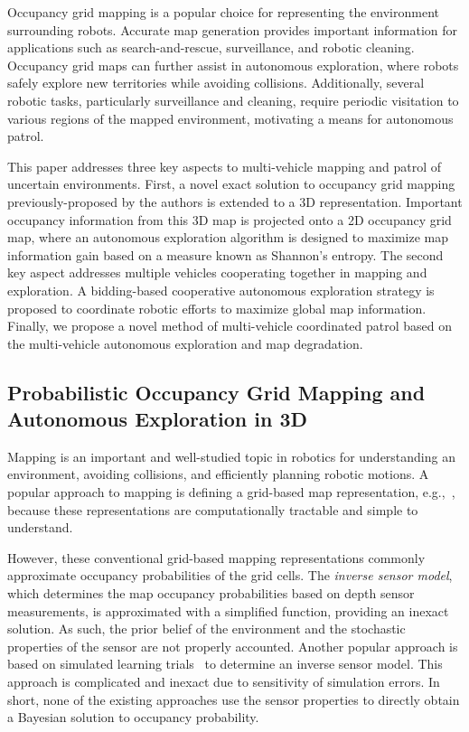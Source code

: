 \documentclass[smallextended]{svjour3}       %
\begin{document}
Occupancy grid mapping is a popular choice for representing the environment surrounding robots. Accurate map generation provides important information for applications such as search-and-rescue, surveillance, and robotic cleaning. Occupancy grid maps can further assist in autonomous exploration, where robots safely explore new territories while avoiding collisions. Additionally, several robotic tasks, particularly surveillance and cleaning, require periodic visitation to various regions of the mapped environment, motivating a means for autonomous patrol.

This paper addresses three key aspects to multi-vehicle mapping and patrol of uncertain environments. First, a novel exact solution to occupancy grid mapping previously-proposed by the authors is extended to a 3D representation. Important occupancy information from this 3D map is projected onto a 2D occupancy grid map, where an autonomous exploration algorithm is designed to maximize map information gain based on a measure known as Shannon's entropy. The second key aspect addresses multiple vehicles cooperating together in mapping and exploration. A bidding-based cooperative autonomous exploration strategy is proposed to coordinate robotic efforts to maximize global map information. Finally, we propose a novel method of multi-vehicle coordinated patrol based on the multi-vehicle autonomous exploration and map degradation.

\subsection{Probabilistic Occupancy Grid Mapping and Autonomous Exploration in 3D}

Mapping is an important and well-studied topic in robotics for understanding an environment, avoiding collisions, and efficiently planning robotic motions.
A popular approach to mapping is defining a grid-based map representation, e.g.,~\cite{WolSuk05,MeyBeiBur12,TanThoWolBus14}, because these representations are computationally tractable and simple to understand.

However, these conventional grid-based mapping representations commonly approximate occupancy probabilities of the grid cells. The \emph{inverse sensor model}, which determines the map occupancy probabilities based on depth sensor measurements, is approximated with a simplified function, providing an inexact solution. As such, the prior belief of the environment and the stochastic properties of the sensor are not properly accounted. Another popular approach is based on simulated learning trials~\cite{Thr01,ThrBurFox05,SouMaiGon12} to determine an inverse sensor model. This approach is complicated and inexact due to sensitivity of simulation errors. In short, none of the existing approaches use the sensor properties to directly obtain a Bayesian solution to occupancy probability.
\end{document}
